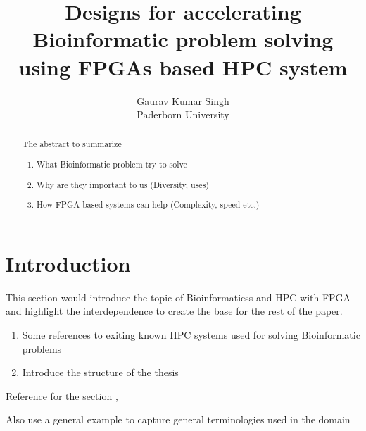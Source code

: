\documentclass[12pt,twoside]{article}
\newcommand{\participant}{Gaurav Kumar Singh}
\newcommand{\affiliation}{Paderborn University}
\newcommand{\topic}{Designs for accelerating Bioinformatic problem solving using FPGAs based HPC system}
\begin{document}
\title{\topic}
\author{\Large{\participant}\\ \affiliation \\ {\small \emailaddress}}
\date{}
\maketitle
\thispagestyle{empty}


\begin{abstract}

  The abstract to summarize

  \begin{enumerate}
	\item What Bioinformatic problem try to solve
	\item Why are they important to us (Diversity, uses)
	\item How FPGA based systems can help (Complexity, speed etc.)
\end{enumerate}
\end{abstract}


\section{Introduction}
\label{sec:introduction}

This section would introduce the topic of Bioinformaticss and HPC with FPGA and highlight the interdependence to create the base for the
rest of the paper.
\begin{enumerate}
	\item Some references to exiting known HPC systems used for solving Bioinformatic problems
	\item Introduce the structure of the thesis
\end{enumerate}

Reference for the section \cite{perez-sanchez_role_2014}, \cite{karanam_using_2006}

Also use a general example to capture general terminologies used in the domain
\end{document}
